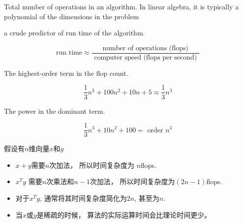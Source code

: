 \begin{definition}
    Total number of operations in an algorithm. In linear algebra, it is typically a polynomial of the dimensions in the problem

\end{definition}
\begin{theorem}[通过浮点运算次数大致预测程序的运行时间]
    a crude predictor of run time of the algorithm.

    \begin{equation}\text{run time}  \approx \frac{\text { number of operations (flops) }}{\text { computer speed (flops per second) }} \end{equation}
\end{theorem}

\begin{definition}
    The highest-order term in the flop count.

\end{definition}

\begin{example}
    \begin{equation}
\frac{1}{3} n^{3}+100 n^{2}+10 n+5 \approx \frac{1}{3} n^{3}
\end{equation}
\end{example}

\begin{definition}[Order]
    The power in the dominant term.
\end{definition}

\begin{example}
    \begin{equation}
\frac{1}{3} n^{3}+10 n^{2}+100=\text { order } n^{3}
\end{equation}
\end{example}


\begin{corollary}
    \label{complexity:vector-operation}
    假设有$n$维向量$x$和$y$

    \begin{itemize}
        \item $x+y$需要$n$次加法， 所以时间复杂度为 $n$flops. 
        \item $x^T y$ 需要$n$次乘法和$n - 1$次加法， 所以时间复杂度为$(2n - 1)$flops. 
        \item 对于$x^T y$, 通常将其时间复杂度简化为$2n$, 甚至为$n$. 
        \item 当$x$或$y$是稀疏的时候， 算法的实际运算时间会比理论时间更少。 
    \end{itemize}
\end{corollary}


